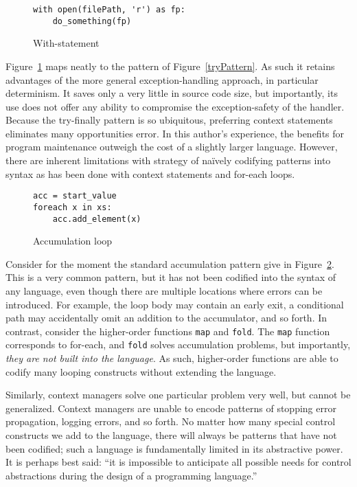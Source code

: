\documentclass[11pt]{article}
\begin{document}
\begin{figure}[h]
\caption{With-statement}
\label{withStatement}
\begin{verbatim}
with open(filePath, 'r') as fp:
    do_something(fp)
\end{verbatim}
\end{figure}

Figure~\ref{withStatement} maps neatly to the pattern of Figure~\ref{tryPattern}.
As such it retains advantages of the more general exception-handling approach, in particular determinism.
It saves only a very little in source code size, but importantly, its use does not offer any ability to compromise the exception-safety of the handler.
Because the try-finally pattern is so ubiquitous, preferring context statements eliminates many opportunities  error.
In this author's experience, the benefits for program maintenance outweigh the cost of a slightly larger language.
However, there are inherent limitations with strategy of na\"ively codifying patterns into syntax as has been done with context statements and for-each loops.

\begin{figure}[h]
\caption{Accumulation loop}
\label{accumLoop}
\begin{verbatim}
acc = start_value
foreach x in xs:
    acc.add_element(x)
\end{verbatim}
\end{figure}

Consider for the moment the standard accumulation pattern give in Figure~\ref{accumLoop}.
This is a very common pattern, but it has not been codified into the syntax of any language, even though there are multiple locations where errors can be introduced.
For example, the loop body may contain an early exit, a conditional path may accidentally omit an addition to the accumulator, and so forth.
In contrast, consider the higher-order functions \texttt{map} and \texttt{fold}.
The \texttt{map} function corresponds to for-each, and \texttt{fold} solves accumulation problems, but importantly, \emph{they are not built into the language}.
As such, higher-order functions are able to codify many looping constructs without extending the language.

Similarly, context managers solve one particular problem very well, but cannot be generalized.
Context managers are unable to encode patterns of stopping error propagation, logging errors, and so forth.
No matter how many special control constructs we add to the language, there will always be patterns that have not been codified; such a language is fundamentally limited in its abstractive power.
It is perhaps best said: ``it is impossible to anticipate all possible needs for control abstractions during the design of a programming language.''\cite{ControlDelimitersHierarchy}
\end{document}
